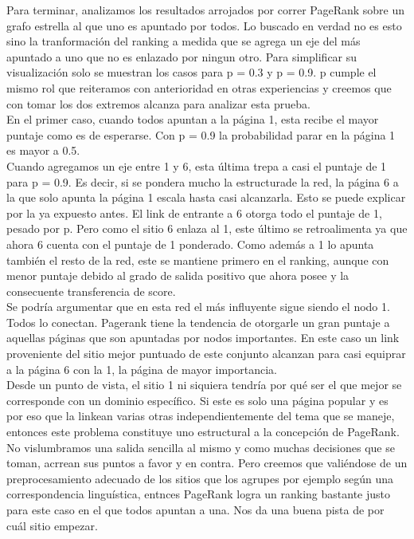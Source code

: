 Para terminar, analizamos los resultados arrojados por correr PageRank sobre un grafo estrella al que uno es apuntado por todos. Lo buscado en verdad no es esto sino la tranformación del ranking a medida que se agrega un eje del más apuntado a uno que no es enlazado por ningun otro. Para simplificar su visualización solo se muestran los casos para p = 0.3 y p = 0.9. 
p cumple el mismo rol que reiteramos con anterioridad en otras experiencias y creemos que con tomar los dos extremos alcanza para analizar esta prueba. \\

En el primer caso, cuando todos apuntan a la página 1, esta recibe el mayor puntaje como es de esperarse. Con p = 0.9 la probabilidad parar en la página 1 es mayor a 0.5. \\
Cuando agregamos un eje entre 1 y 6, esta última trepa a casi el puntaje de 1 para p = 0.9. Es decir, si se pondera mucho la estructurade la red, la página 6 a la que solo apunta la página 1 escala hasta casi alcanzarla. Esto se puede explicar por la ya expuesto antes. El link de entrante a 6 otorga todo el puntaje de 1, pesado por p. Pero como el sitio 6 enlaza al 1, este último se retroalimenta ya que ahora 6 cuenta con el puntaje de 1 ponderado. Como además a 1 lo apunta también el resto de la red, este se mantiene primero en el ranking, aunque con menor puntaje debido al grado de salida positivo que ahora posee y la consecuente transferencia de score. \\

Se podría argumentar que en esta red el más influyente sigue siendo el nodo 1. Todos lo conectan. Pagerank tiene la tendencia de otorgarle un gran puntaje a aquellas páginas que son apuntadas por nodos importantes. En este caso un link proveniente del sitio mejor puntuado de este conjunto alcanzan para casi equiprar a la página 6 con la 1, la página de mayor importancia. \\

Desde un punto de vista, el sitio 1 ni siquiera tendría por qué ser el que mejor se corresponde con un dominio específico. Si este es solo una página popular y es por eso que la linkean varias otras independientemente del tema que se maneje, entonces este problema constituye uno estructural a la concepción de PageRank. No vislumbramos una salida sencilla al mismo y como muchas decisiones que se toman, acrrean sus puntos a favor y en contra. Pero creemos que valiéndose de un preprocesamiento adecuado de los sitios que los agrupes por ejemplo según una correspondencia linguística, entnces PageRank logra un ranking bastante justo para este caso en el que todos apuntan a una. Nos da una buena pista de por cuál sitio empezar. \\

